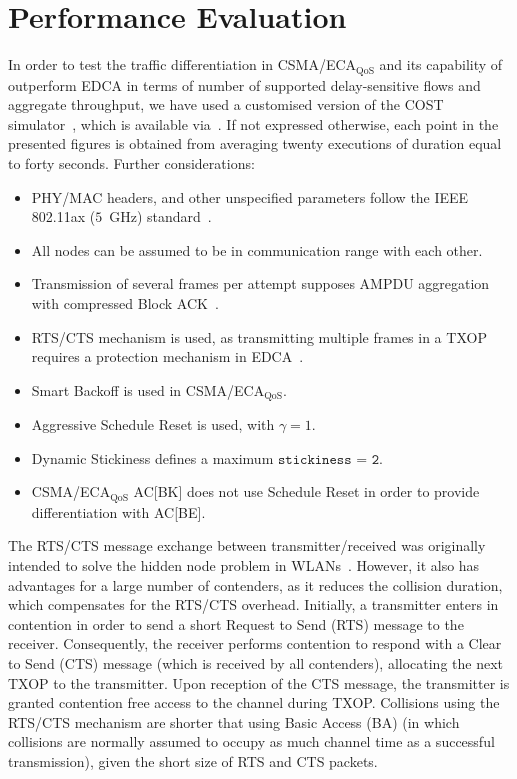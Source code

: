 \documentclass[a4paper]{article}
\begin{document}
\section{Performance Evaluation}\label{section4}
In order to test the traffic differentiation in CSMA/ECA$_{\text{QoS}}$ and its capability of outperform EDCA in terms of number of supported delay-sensitive flows and aggregate throughput, we have used a customised version of the COST simulator~\cite{COST}, which is available via~\cite{CSMA-ECA-HEW}. If not expressed otherwise, each point in the presented figures is obtained from averaging twenty executions of duration equal to forty seconds. Further considerations:
	\begin{itemize}
		\item PHY/MAC headers, and other unspecified parameters follow the IEEE 802.11ax ($5$~GHz) standard~\cite{IEEE80211ax}.
		\item All nodes can be assumed to be in communication range with each other.
		\item Transmission of several frames per attempt supposes AMPDU aggregation with compressed Block ACK~\cite{perahia2013next}.
		\item RTS/CTS mechanism is used, as transmitting multiple frames in a TXOP requires a protection mechanism in EDCA~\cite{80211e}.
\item Smart Backoff is used in CSMA/ECA$_\text{QoS}$.
		\item Aggressive Schedule Reset is used, with $\gamma=1$.
		\item Dynamic Stickiness defines a maximum ${\texttt{stickiness = 2}}$.
		\item CSMA/ECA$_{\text{QoS}}$ AC[BK] does not use Schedule Reset in order to provide differentiation with AC[BE].
	\end{itemize}

The RTS/CTS message exchange between transmitter/received was originally intended to solve the hidden node problem in WLANs~\cite{perahia2013next}. However, it also has advantages for a large number of contenders, as it reduces the collision duration, which compensates for the RTS/CTS overhead. Initially, a transmitter enters in contention in order to send a short Request to Send (RTS) message to the receiver. Consequently, the receiver performs contention to respond with a Clear to Send (CTS) message (which is received by all contenders), allocating the next TXOP to the transmitter. Upon reception of the CTS message, the transmitter is granted contention free access to the channel during TXOP. Collisions using the RTS/CTS mechanism are shorter that using Basic Access (BA) (in which collisions are normally assumed to occupy as much channel time as a successful transmission), given the short size of RTS and CTS packets.
\end{document}
